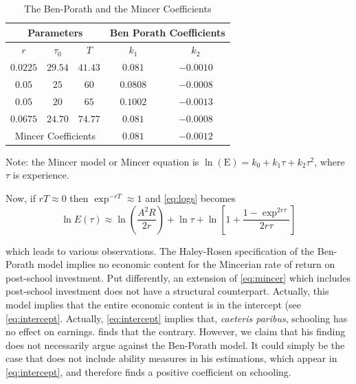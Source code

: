 \begin{center}
\begin{table}[H]
\begin{threeparttable}
\fontsize{9}{12pt}\selectfont
\caption{The Ben-Porath and the Mincer Coefficients} \label{table:bpmincer}
\centering
\begin{tabular}{ccc|cc}
\multicolumn{3}{c|}{Parameters} & \multicolumn{2}{c}{Ben Porath
Coefficients} \\ \hline\hline $r$ & $\tau _{0}$ & $T$ & $k_{1}$ &
$k_{2}$ \\ \hline $0.0225$ & $29.54$ & $41.43$ & $0.081$ & $-0.0010$
\\ \hline $0.05$ & $25$ & $60$ & $0.0808$ & $-0.0008$ \\ \hline
$0.05$ & $20$ & $65$ & $0.1002$ & $-0.0013$ \\ \hline $0.0675$ &
$24.70$ & $74.77$ & $0.081$ & $-0.0008$ \\ \hline\hline
\multicolumn{3}{c}{Mincer Coefficients} & $0.081$ & $-0.0012$ \\
\hline
\end{tabular}
\begin{tablenotes}
\small
\item Note: the Mincer model or Mincer equation is $\ln ( \text{E} ) =k_{0}+k_{1}\tau +k_{2}\tau^{2}$, where $\tau$ is experience.  
\end{tablenotes}
\end{threeparttable}
\end{table}
\end{center}

Now, if $rT \approx 0$ then $\exp^{-rT} \approx 1$ and \eqref{eq:logs} becomes 
\begin{equation}
\ln E(\tau) \approx \ln \left( \frac{A^2 R}{2r} \right) + \ln \tau + \ln \left[ 1 + \frac{1 - \exp^{2r \tau}}{2 r \tau} \right] \label{eq:intercept}
\end{equation}

which leads to various observations. The Haley-Rosen specification of the Ben-Porath model implies no economic content for the Mincerian rate of return on post-school investment. Put differently, an extension of \eqref{eq:mincer} which includes post-school investment does not have a structural counterpart. Actually, this model implies that the entire economic content is in the intercept (see \eqref{eq:intercept}. Actually, \eqref{eq:intercept} implies that, \textit{caeteris paribus}, schooling has no effect on earnings. \citet{mincer1974schooling} finds that the contrary. However, we claim that his finding does not necessarily argue against the Ben-Porath model. It could simply be the case that \citet{mincer1974schooling} does not include ability measures in his estimations, which appear in \eqref{eq:intercept}, and therefore finds a positive coefficient on schooling. 
 

